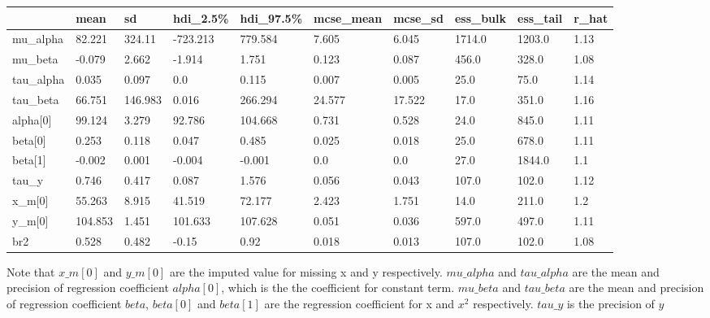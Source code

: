 \documentclass{homeworg}
\begin{document}

\begin{table}[h]
	\begin{tabular}{llllllllll}
		\hline\hline
		& mean    & sd     & hdi\_2.5\% & hdi\_97.5\% & mcse\_mean & mcse\_sd & ess\_bulk & ess\_tail & r\_hat \\ \hline
		mu\_alpha                  & 82.221  & 324.11  & -723.213 & 779.584 & 7.605  & 6.045  & 1714.0 & 1203.0 & 1.13 \\
		mu\_beta                   & -0.079  & 2.662   & -1.914   & 1.751   & 0.123  & 0.087  & 456.0  & 328.0  & 1.08 \\
		tau\_alpha                 & 0.035   & 0.097   & 0.0      & 0.115   & 0.007  & 0.005  & 25.0   & 75.0   & 1.14 \\
		tau\_beta                  & 66.751  & 146.983 & 0.016    & 266.294 & 24.577 & 17.522 & 17.0   & 351.0  & 1.16 \\
		alpha{[}0{]}               & 99.124  & 3.279   & 92.786   & 104.668 & 0.731  & 0.528  & 24.0   & 845.0  & 1.11 \\
		beta{[}0{]}                & 0.253   & 0.118   & 0.047    & 0.485   & 0.025  & 0.018  & 25.0   & 678.0  & 1.11 \\
		beta{[}1{]}                & -0.002  & 0.001   & -0.004   & -0.001  & 0.0    & 0.0    & 27.0   & 1844.0 & 1.1  \\
		tau\_y                   & 0.746   & 0.417   & 0.087    & 1.576   & 0.056  & 0.043  & 107.0  & 102.0  & 1.12 \\
		x\_m{[}0{]} & 55.263  & 8.915   & 41.519   & 72.177  & 2.423  & 1.751  & 14.0   & 211.0  & 1.2 \\
		y\_m{[}0{]}        & 104.853 & 1.451   & 101.633  & 107.628 & 0.051  & 0.036  & 597.0  & 497.0  & 1.11 \\
		br2 & 0.528 & 0.482 & -0.15 & 0.92 & 0.018 & 0.013 & 107.0 & 102.0 & 1.08 
		\\ \hline\hline
	\end{tabular}
Note that $x\_m[0]$ and $y\_m[0]$  are the imputed value for missing x and y respectively. $mu\_alpha$ and $tau\_alpha$ are the mean and precision of regression coefficient $alpha[0]$, which is the the coefficient for constant term. $mu\_beta$ and $tau\_beta$ are the mean and precision of regression coefficient $beta$, $beta[0]$ and $beta[1]$ are the regression coefficient for x and $x^2$ respectively. $tau\_y$ is the precision of $y$ 
\end{table}
\end{document}
